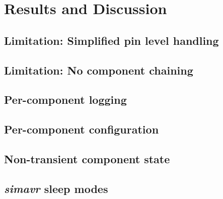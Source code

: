 
\chapter{Results and Discussion} \label{chapter:results}

\section{Limitation: Simplified pin level handling}


\section{Limitation: No component chaining}

\section{Per-component logging}
\section{Per-component configuration}


\section{Non-transient component state}


\section{\emph{simavr} sleep modes}

